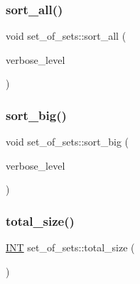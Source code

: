 \mbox{\label{classset__of__sets_ac8897050f1478c7cb9b15627acad7876}} 
\subsubsection{\texorpdfstring{sort\+\_\+all()}{sort\_all()}}
{\footnotesize\ttfamily void set\+\_\+of\+\_\+sets\+::sort\+\_\+all (\begin{DoxyParamCaption}\item[{\mbox{\hyperlink{galois_8h_a09fddde158a3a20bd2dcadb609de11dc}{I\+NT}}}]{verbose\+\_\+level }\end{DoxyParamCaption})}

\mbox{\label{classset__of__sets_af85e50a6cc8807b67cea6feea7e64474}} 
\subsubsection{\texorpdfstring{sort\+\_\+big()}{sort\_big()}}
{\footnotesize\ttfamily void set\+\_\+of\+\_\+sets\+::sort\+\_\+big (\begin{DoxyParamCaption}\item[{\mbox{\hyperlink{galois_8h_a09fddde158a3a20bd2dcadb609de11dc}{I\+NT}}}]{verbose\+\_\+level }\end{DoxyParamCaption})}

\mbox{\label{classset__of__sets_af96cd6c538107806b02d19defb54059e}} 
\subsubsection{\texorpdfstring{total\+\_\+size()}{total\_size()}}
{\footnotesize\ttfamily \mbox{\hyperlink{galois_8h_a09fddde158a3a20bd2dcadb609de11dc}{I\+NT}} set\+\_\+of\+\_\+sets\+::total\+\_\+size (\begin{DoxyParamCaption}{ }\end{DoxyParamCaption})}



